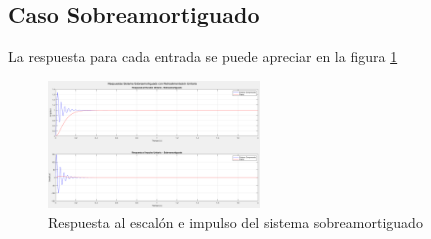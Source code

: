 \documentclass[conference]{IEEEtran}
\begin{document}
	\subsection{Caso Sobreamortiguado}
	La respuesta para cada entrada se puede apreciar en la figura \ref{fig:respuesta-sobre}
	\begin{figure}[h]
		\centering
		\includegraphics[width=0.5\textwidth]{media/respuesta-sobre}
		\caption{Respuesta al escalón e impulso del sistema sobreamortiguado}
		\label{fig:respuesta-sobre}
	\end{figure}
	
	
	
\end{document}
